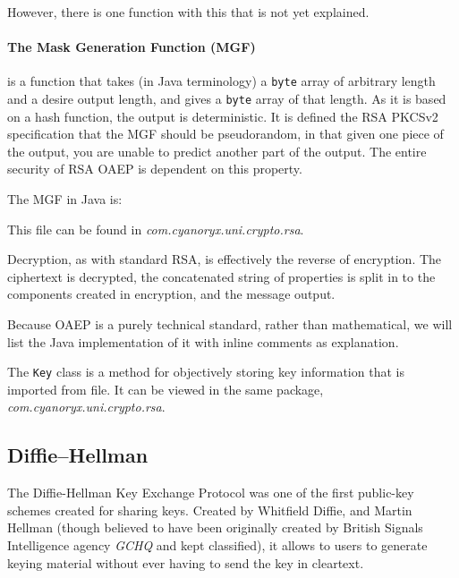     However, there is one function with this that is not yet explained.
    
    \paragraph{The Mask Generation Function (MGF)}
    
    is a function that takes (in Java terminology) a \verb!byte! array of arbitrary length and a desire output length, and gives a \verb!byte! array of that length. As it is based on a hash function, the output is deterministic. It is defined the RSA PKCSv2 specification \cite{Jonsson:2003aa} that the MGF should be pseudorandom, in that given one piece of the output, you are unable to predict another part of the output. The entire security of RSA OAEP is dependent on this property. 
    
    The MGF in Java is:
    
    
    This file can be found in \emph{com.cyanoryx.uni.crypto.rsa}.
    
    Decryption, as with standard RSA, is effectively the reverse of encryption. The ciphertext is decrypted, the concatenated string of properties is split in to the components created in encryption, and the message output.
        
    Because OAEP is a purely technical standard, rather than mathematical, we will list the Java implementation of it with inline comments as explanation.
    
    
    
    The \verb!Key! class is a method for objectively storing key information that is imported from file. It can be viewed in the same package, \emph{com.cyanoryx.uni.crypto.rsa}.

  \subsection{Diffie--Hellman}
  
  The Diffie-Hellman Key Exchange Protocol was one of the first public-key schemes created for sharing keys. Created by Whitfield Diffie, and Martin Hellman (though believed to have been originally created by British Signals Intelligence agency \emph{GCHQ} and kept classified), it allows to users to generate keying material without ever having to send the key in cleartext.
  
